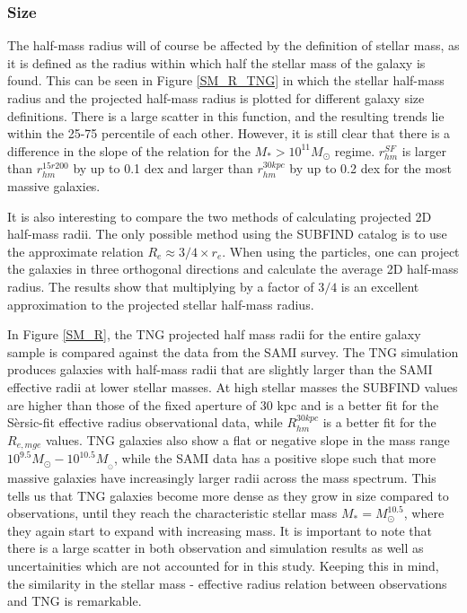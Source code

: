 \subsubsection{Size}
The half-mass radius will of course be affected by the definition of stellar mass, as it is defined as the radius within which half the stellar mass of the galaxy is found. This can be seen in Figure \ref{SM_R_TNG} in which the stellar half-mass radius and the projected half-mass radius is plotted for different galaxy size definitions. There is a large scatter in this function, and the resulting trends lie within the 25-75 percentile of each other. However, it is still clear that there is a difference in the slope of the relation for the $M_\ast > 10^{11} M_{\odot}$ regime. $r^{SF}_{hm}$ is larger than $r^{15r200}_{hm}$ by up to 0.1 dex and larger than $r^{30kpc}_{hm}$ by up to 0.2 dex for the most massive galaxies. 

 It is also interesting to compare the two methods of calculating projected 2D half-mass radii. The only possible method using the SUBFIND catalog is to use the approximate relation $R_{e} \approx 3/4 \times r_{e}$. When using the particles, one can project the galaxies in three orthogonal directions and calculate the average 2D half-mass radius. The results show that multiplying by a factor of $3/4$ is an excellent approximation to the projected stellar half-mass radius.

In Figure \ref{SM_R}, the TNG projected half mass radii for the entire galaxy sample is compared against the data from the SAMI survey. The TNG simulation produces galaxies with half-mass radii that are slightly larger than the SAMI effective radii at lower stellar masses. At high stellar masses the SUBFIND values are higher than those of the fixed aperture of 30 kpc and is a better fit for the Sèrsic-fit effective radius observational data, while $R_{hm}^{30kpc}$ is a better fit for the $R_{e, mge}$ values. TNG galaxies also show a flat or negative slope in the mass range $10^{9.5} M_{\odot} - 10^{10.5} M_{_\odot}$, while the SAMI data has a positive slope such that more massive galaxies have increasingly larger radii across the mass spectrum. This tells us that TNG galaxies become more dense as they grow in size compared to observations, until they reach the characteristic stellar mass $M_\ast = M^{10.5}_{\odot}$, where they again start to expand with increasing mass. It is important to note that there is a large scatter in both observation and simulation results as well as uncertainities which are not accounted for in this study. Keeping this in mind, the similarity in the stellar mass - effective radius relation between observations and TNG is remarkable. 



